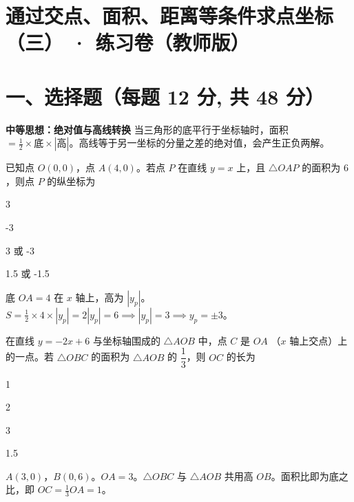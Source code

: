 \documentclass{exam-zh}
\begin{document}
\section*{通过交点、面积、距离等条件求点坐标（三） · 练习卷（教师版）}

\section*{一、选择题（每题 12 分, 共 48 分）}


\begin{keyideabox}
  \textbf{中等思想：绝对值与高线转换}
  当三角形的底平行于坐标轴时，面积 $= \frac{1}{2} \times \text{底} \times |\text{高}|$。高线等于另一坐标的分量之差的绝对值，会产生正负两解。
\end{keyideabox}



\begin{question}[points=12]
  已知点 $O(0, 0)$，点 $A(4, 0)$。若点 $P$ 在直线 $y = x$ 上，且 $\triangle OAP$ 的面积为 $6$，则点 $P$ 的纵坐标为
  \begin{choices}
    \item 3
    \item -3
    \item 3 或 -3
    \item 1.5 或 -1.5
  \end{choices}
  \paren[C]
  \begin{solutionblock}
    底 $OA = 4$ 在 $x$ 轴上，高为 $|y_p|$。$S = \frac{1}{2} \times 4 \times |y_p| = 2|y_p| = 6 \implies |y_p| = 3 \implies y_p = \pm 3$。
  \end{solutionblock}
\end{question}



\begin{question}[points=12]
  在直线 $y = -2x + 6$ 与坐标轴围成的 $\triangle AOB$ 中，点 $C$ 是 $OA$ （$x$ 轴上交点）上的一点。若 $\triangle OBC$ 的面积为 $\triangle AOB$ 的 $\dfrac{1}{3}$，则 $OC$ 的长为
  \begin{choices}
    \item 1
    \item 2
    \item 3
    \item 1.5
  \end{choices}
  \paren[A]
  \begin{solutionblock}
    $A(3, 0)$，$B(0, 6)$。$OA = 3$。$\triangle OBC$ 与 $\triangle AOB$ 共用高 $OB$。面积比即为底之比，即 $OC = \frac{1}{3} OA = 1$。
  \end{solutionblock}
\end{question}
\end{document}
